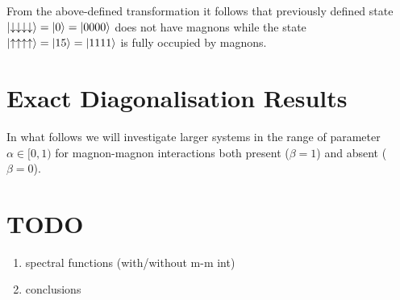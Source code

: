 \documentclass[12pt, a4paper]{article}
\begin{document}
From the above-defined transformation it follows that previously defined state $\ket{\downarrow\downarrow\downarrow\downarrow} = \ket{0} = \ket{0 0 0 0}$ does not have magnons while the state $\ket{\uparrow\uparrow\uparrow\uparrow} = \ket{15} = \ket{1 1 1 1}$ is fully occupied by magnons.

\section{Exact Diagonalisation Results}\label{sec:ed_results}
In what follows we will investigate larger systems in the range of parameter $\alpha \in [0, 1)$ for magnon-magnon interactions both present ($\beta = 1$) and absent ($\beta = 0$). 

\section{TODO}
\begin{enumerate}
	\item spectral functions (with/without m-m int)
	\item conclusions
\end{enumerate}



\end{document}
